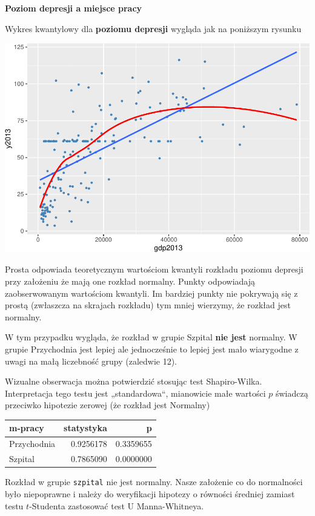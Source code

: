 \documentclass[
  openany]{book}
\begin{document}
\begin{example}
\textbf{Poziom depresji a miejsce pracy}

Wykres kwantylowy dla \textbf{poziomu depresji}
wygląda jak na poniższym rysunku

\includegraphics{_main_files/figure-latex/unnamed-chunk-49-1.pdf}

Prosta odpowiada teoretycznym wartościom kwantyli rozkładu poziomu depresji przy założeniu
że mają one rozkład normalny. Punkty odpowiadają zaobserwowanym wartościom kwantyli.
Im bardziej punkty nie pokrywają się z prostą
(zwłaszcza na skrajach rozkładu) tym mniej wierzymy, że rozkład jest normalny.

W tym przypadku wygląda, że rozkład w grupie Szpital \textbf{nie jest} normalny.
W grupie Przychodnia jest lepiej ale jednocześnie to lepiej jest mało wiarygodne
z uwagi na małą liczebność grupy (zaledwie 12).

Wizualne obserwacja można potwierdzić stosując test Shapiro-Wilka.
Interpretacja tego testu jest „standardowa``, mianowicie małe wartości \(p\)
świadczą przeciwko hipotezie zerowej (że rozkład jest Normalny)

\begin{tabular}{l|r|r}
\hline
m-pracy & statystyka & p\\
\hline
Przychodnia & 0.9256178 & 0.3359655\\
\hline
Szpital & 0.7865090 & 0.0000000\\
\hline
\end{tabular}

Rozkład w grupie \texttt{szpital} nie jest normalny. Nasze założenie co do normalności
było niepoprawne i należy do weryfikacji hipotezy o równości średniej zamiast
testu \(t\)-Studenta zastosować test U Manna-Whitneya.
\end{example}
\end{document}
